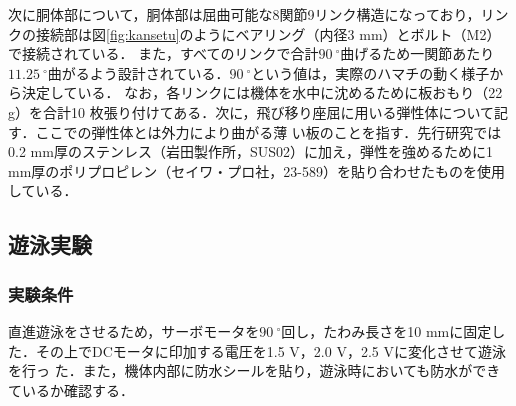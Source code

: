 次に胴体部について，胴体部は屈曲可能な8関節9リンク構造になっており，リンクの接続部は図\ref{fig:kansetu}のようにベアリング（内径3 mm）とボルト（M2）で接続されている．
また，すべてのリンクで合計$90\:^\circ$曲げるため一関節あたり$11.25\:^\circ$曲がるよう設計されている．$90\:^\circ$という値は，実際のハマチの動く様子から決定している．
なお，各リンクには機体を水中に沈めるために板おもり（22 g）を合計10 枚張り付けてある．次に，飛び移り座屈に用いる弾性体について記す．ここでの弾性体とは外力により曲がる薄
い板のことを指す．先行研究では0.2 mm厚のステンレス（岩田製作所，SUS02）に加え，弾性を強めるために1 mm厚のポリプロピレン（セイワ・プロ社，23-589）を貼り合わせたものを使用している．

\subsection{遊泳実験}
\subsubsection{実験条件}
直進遊泳をさせるため，サーボモータを$90\:^\circ$回し，たわみ長さを10 mmに固定した．その上でDCモータに印加する電圧を1.5 V，2.0 V，2.5 Vに変化させて遊泳を行っ
た．また，機体内部に防水シールを貼り，遊泳時においても防水ができているか確認する．



